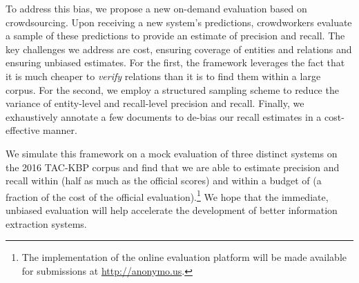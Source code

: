 To address this bias, we propose a new on-demand evaluation based on crowdsourcing.
Upon receiving a new system's predictions, crowdworkers evaluate a sample of these predictions to provide an estimate of precision and recall.
The key challenges we address are cost, ensuring coverage of entities and relations and ensuring unbiased estimates.
For the first, the framework leverages the fact that it is much cheaper to \textit{verify} relations than it is to find them within a large corpus.
For the second, we employ a structured sampling scheme to reduce the variance of entity-level and recall-level precision and recall.
Finally, we exhaustively annotate a few documents to de-bias our recall estimates in a cost-effective manner.




We simulate this framework on a mock evaluation of three distinct systems on the 2016 TAC-KBP corpus and find that we are able to estimate precision and recall within  \fone{} (half as much as the official scores) and within a budget of  (a fraction of the cost of the official evaluation).\footnote{%
  The implementation of the online evaluation platform will be made available for submissions at \url{http://anonymo.us}.
}
We hope that the immediate, unbiased evaluation
will help accelerate the development of better information extraction systems.

